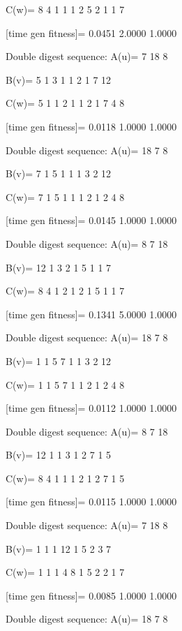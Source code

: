 C(w)=
     8     4     1     1     1     2     5     2     1     1     7

[time gen fitness]=
    0.0451    2.0000    1.0000

Double digest sequence:
A(u)=
     7    18     8

B(v)=
     5     1     3     1     1     2     1     7    12

C(w)=
     5     1     1     2     1     1     2     1     7     4     8

[time gen fitness]=
    0.0118    1.0000    1.0000

Double digest sequence:
A(u)=
    18     7     8

B(v)=
     7     1     5     1     1     1     3     2    12

C(w)=
     7     1     5     1     1     1     2     1     2     4     8

[time gen fitness]=
    0.0145    1.0000    1.0000

Double digest sequence:
A(u)=
     8     7    18

B(v)=
    12     1     3     2     1     5     1     1     7

C(w)=
     8     4     1     2     1     2     1     5     1     1     7

[time gen fitness]=
    0.1341    5.0000    1.0000

Double digest sequence:
A(u)=
    18     7     8

B(v)=
     1     1     5     7     1     1     3     2    12

C(w)=
     1     1     5     7     1     1     2     1     2     4     8

[time gen fitness]=
    0.0112    1.0000    1.0000

Double digest sequence:
A(u)=
     8     7    18

B(v)=
    12     1     1     3     1     2     7     1     5

C(w)=
     8     4     1     1     1     2     1     2     7     1     5

[time gen fitness]=
    0.0115    1.0000    1.0000

Double digest sequence:
A(u)=
     7    18     8

B(v)=
     1     1     1    12     1     5     2     3     7

C(w)=
     1     1     1     4     8     1     5     2     2     1     7

[time gen fitness]=
    0.0085    1.0000    1.0000

Double digest sequence:
A(u)=
    18     7     8

